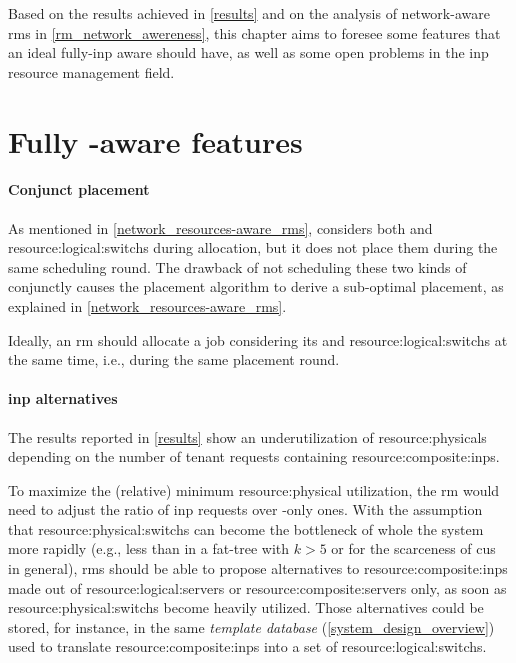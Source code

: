 Based on the results achieved in \autoref{results} and on the analysis of network-aware \glspl{rm} in \autoref{rm_network_awereness}, this chapter aims to foresee some features that an ideal fully-\gls{inp} aware  should have, as well as some open problems in the \gls{inp} resource management field.

\section{Fully \texorpdfstring{}{INP}-aware \texorpdfstring{}{RM} features}

\paragraph{Conjunct placement}
As mentioned in \autoref{network_resources-aware_rms}, \cite{ontackling} considers both  and \glspl{resource:logical:switch} during allocation, but it does not place them during the same scheduling round.
The drawback of not scheduling these two kinds of  conjunctly causes the placement algorithm to derive a sub-optimal placement, as explained in \autoref{network_resources-aware_rms}.

Ideally, an \gls{rm} should allocate a job considering its  and \glspl{resource:logical:switch} at the same time, i.e., during the same placement round.

\paragraph{\gls{inp} alternatives}
The results reported in \autoref{results} show an underutilization of \glspl{resource:physical} depending on the number of tenant requests containing \glspl{resource:composite:inp}.

To maximize the (relative) minimum \gls{resource:physical} utilization, the \gls{rm} would need to adjust the ratio of \gls{inp} requests over -only ones.
With the assumption that \glspl{resource:physical:switch} can become the bottleneck of whole the system more rapidly (e.g., less  than  in a fat-tree with $k>5$ or for the scarceness of \glspl{cu} in general),
\glspl{rm} should be able to propose alternatives to \glspl{resource:composite:inp} made out of \glspl{resource:logical:server} or \glspl{resource:composite:server} only, as soon as \glspl{resource:physical:switch} become heavily utilized.
Those alternatives could be stored, for instance, in the same \textit{template database} (\autoref{system_design_overview}) used to translate \glspl{resource:composite:inp} into a set of \glspl{resource:logical:switch}.

